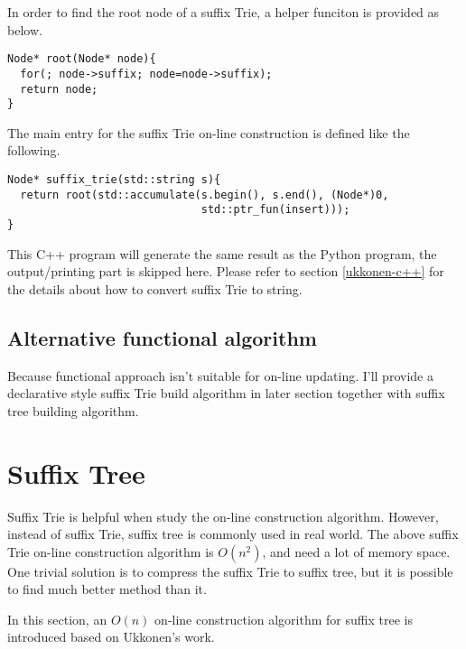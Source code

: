 \documentclass{article}
\begin{document}
In order to find the root node of a suffix Trie, a helper funciton
is provided as below.

\begin{lstlisting}
Node* root(Node* node){
  for(; node->suffix; node=node->suffix);
  return node;
}
\end{lstlisting}

The main entry for the suffix Trie on-line construction is
defined like the following.

\begin{lstlisting}
Node* suffix_trie(std::string s){
  return root(std::accumulate(s.begin(), s.end(), (Node*)0, 
                              std::ptr_fun(insert)));
}
\end{lstlisting}

This C++ program will generate the same result as the Python
program, the output/printing part is skipped here. Please
refer to section \ref{ukkonen-c++} for the details about how
to convert suffix Trie to string.

\subsection{Alternative functional algorithm}
Because functional approach isn't suitable for on-line updating.
I'll provide a declarative style suffix Trie build algorithm in later
section together with suffix tree building algorithm.


\section{Suffix Tree} 

Suffix Trie is helpful when study the on-line construction algorithm.
However, instead of suffix Trie, suffix tree is commonly used in real world.
The above suffix Trie on-line construction algorithm is $O(n^2)$, and 
need a lot of memory space. One trivial solution is to compress the 
suffix Trie to suffix tree\cite{trivial-stree-java}, but it is possible
to find much better method than it.

In this section, an $O(n)$ on-line construction
algorithm for suffix tree is introduced based on Ukkonen's work\cite{ukkonen95}.

\end{document}
